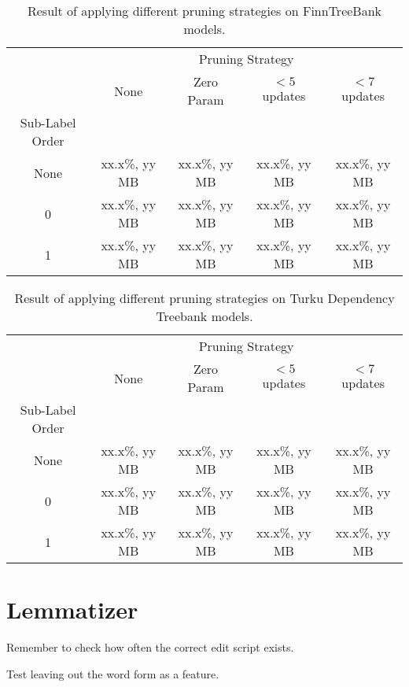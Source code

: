 \begin{table}[htb!]
\begin{center}
\begin{tabular}{ccccc}
                & \multicolumn{4}{c}{Pruning Strategy}\\
                & None           & Zero Param    & $< 5$ updates  & $< 7$ updates  \\
Sub-Label Order &                &               &                &                \\
\hline
None            & xx.x\%, yy MB  & xx.x\%, yy MB  & xx.x\%, yy MB & xx.x\%, yy MB \\
0               & xx.x\%, yy MB  & xx.x\%, yy MB  & xx.x\%, yy MB & xx.x\%, yy MB \\
1               & xx.x\%, yy MB  & xx.x\%, yy MB  & xx.x\%, yy MB & xx.x\%, yy MB \\
\hline
\end{tabular}
\caption{Result of applying different pruning strategies on FinnTreeBank models.}
\end{center}
\end{table}

\begin{table}[htb!]
\begin{center}
\begin{tabular}{ccccc}
                & \multicolumn{4}{c}{Pruning Strategy}\\
                & None           & Zero Param     & $< 5$ updates  & $< 7$ updates  \\
Sub-Label Order &                &                &                &                \\
\hline
None            & xx.x\%, yy MB  & xx.x\%, yy MB  & xx.x\%, yy MB & xx.x\%, yy MB \\
0               & xx.x\%, yy MB  & xx.x\%, yy MB  & xx.x\%, yy MB & xx.x\%, yy MB \\
1               & xx.x\%, yy MB  & xx.x\%, yy MB  & xx.x\%, yy MB & xx.x\%, yy MB \\
\hline
\end{tabular}
\caption{Result of applying different pruning strategies on Turku Dependency Treebank models.}
\end{center}
\end{table}

\section{Lemmatizer}

Remember to check how often the correct edit script exists.

Test leaving out the word form as a feature.